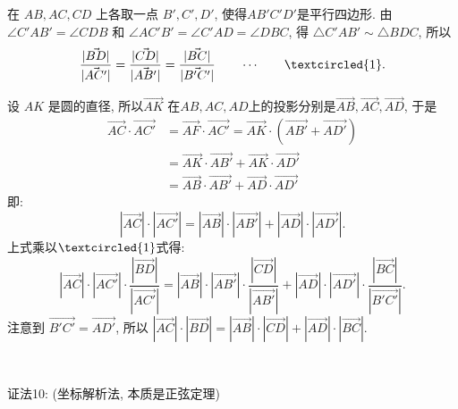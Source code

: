 在 $AB, AC, CD$ 上各取一点 $B',C',D'$, 使得$AB'C'D'$是平行四边形. 由 $\angle C'AB' = \angle CDB$ 和 $\angle AC'B' = \angle C'AD = \angle DBC$, 得 $\triangle C'AB'\sim\triangle BDC$, 所以
\[\frac{|\vec{BD}|}{|\vec{AC'}|} = \frac{|\vec{CD}|}{|\vec{AB'}|} = \frac{|\vec{BC}|}{|\vec{B'C'}|} \qquad\cdots\qquad \textcircled{1}.\]

设 $AK$ 是圆的直径, 所以$\vec{AK}$ 在$AB,AC,AD$上的投影分别是$\vec{AB},\vec{AC},\vec{AD}$, 于是
\begin{align*}
\vec{AC}\cdot\vec{AC'} &= \vec{AF}\cdot\vec{AC'} = \vec{AK}\cdot(\vec{AB'}+\vec{AD'})\\
&= \vec{AK}\cdot\vec{AB'}+\vec{AK}\cdot\vec{AD'}\\
&= \vec{AB}\cdot\vec{AB'}+\vec{AD}\cdot\vec{AD'}
\end{align*}
即: \[|\vec{AC}|\cdot|\vec{AC'}| = |\vec{AB}|\cdot|\vec{AB'}| + |\vec{AD}|\cdot|\vec{AD'}| .\]
上式乘以$\textcircled{1}$式得: 
\[|\vec{AC}|\cdot|\vec{AC'}|\cdot\frac{|\vec{BD}|}{|\vec{AC'}|} = |\vec{AB}|\cdot|\vec{AB'}|\cdot\frac{|\vec{CD}|}{|\vec{AB'}|} + |\vec{AD}|\cdot|\vec{AD'}|\cdot\frac{|\vec{BC}|}{|\vec{B'C'}|} .\]
注意到 $\vec{B'C'}=\vec{AD'}$, 所以 $|\vec{AC}|\cdot|\vec{BD}| = |\vec{AB}|\cdot|\vec{CD}|+|\vec{AD}|\cdot|\vec{BC}|$.

~

证法10: (坐标解析法, 本质是正弦定理)
\begin{figure*}[htbp]
\centering
{}
\end{figure*}

